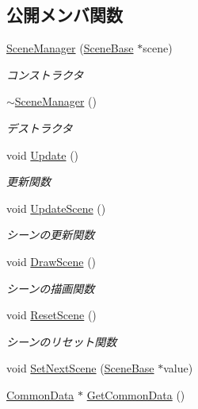 \subsection*{公開メンバ関数}
\begin{DoxyCompactItemize}
\item 
\mbox{\hyperlink{class_scene_manager_a09b02940c85038e4e00aae2afefafa58}{Scene\+Manager}} (\mbox{\hyperlink{class_scene_base}{Scene\+Base}} $\ast$scene)
\begin{DoxyCompactList}\small\item\em コンストラクタ \end{DoxyCompactList}\item 
\mbox{\hyperlink{class_scene_manager_a2bb376a85d29e85f47753e26c7539229}{$\sim$\+Scene\+Manager}} ()
\begin{DoxyCompactList}\small\item\em デストラクタ \end{DoxyCompactList}\item 
void \mbox{\hyperlink{class_scene_manager_a63dcf65832d6a2c190bf496d9a3b00a3}{Update}} ()
\begin{DoxyCompactList}\small\item\em 更新関数 \end{DoxyCompactList}\item 
void \mbox{\hyperlink{class_scene_manager_a493bc0d65558ce004f6f248a185ba956}{Update\+Scene}} ()
\begin{DoxyCompactList}\small\item\em シーンの更新関数 \end{DoxyCompactList}\item 
void \mbox{\hyperlink{class_scene_manager_a828b35826f757b8af34aa767c6b40378}{Draw\+Scene}} ()
\begin{DoxyCompactList}\small\item\em シーンの描画関数 \end{DoxyCompactList}\item 
void \mbox{\hyperlink{class_scene_manager_a1759161a38025ec8212dc98439fd7335}{Reset\+Scene}} ()
\begin{DoxyCompactList}\small\item\em シーンのリセット関数 \end{DoxyCompactList}\item 
void \mbox{\hyperlink{class_scene_manager_ac59d21dd031179035238802658594991}{Set\+Next\+Scene}} (\mbox{\hyperlink{class_scene_base}{Scene\+Base}} $\ast$value)
\item 
\mbox{\hyperlink{class_scene_manager_1_1_common_data}{Common\+Data}} $\ast$ \mbox{\hyperlink{class_scene_manager_ad2fb33bb5ff645427353d7085c8be8d4}{Get\+Common\+Data}} ()

\end{DoxyCompactItemize}

